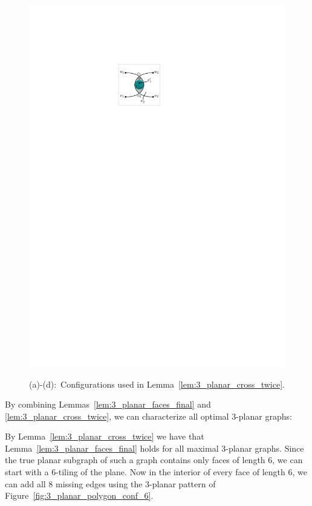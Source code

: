 \begin{figure}[htb]
\begin{minipage}[b]{.24\textwidth}
        \includegraphics[width=\textwidth,page=4]{images/3_planar_cross_twice}
        \subcaption{~}\label{fig:3_planar_cross_twice_main}
    \end{minipage}
    \caption{%
    (a)-(d):~Configurations used in Lemma~\ref{lem:3_planar_cross_twice}.
    \label{fig:3_planar_one_crossing_2}}
\end{figure}

By combining Lemmas~\ref{lem:3_planar_faces_final} and \ref{lem:3_planar_cross_twice}, we can characterize all optimal $3$-planar graphs:


 By Lemma~\ref{lem:3_planar_cross_twice} we have that Lemma~\ref{lem:3_planar_faces_final} holds for all maximal $3$-planar graphs. Since the true planar subgraph of such a graph contains only faces of length $6$, we can start with a $6$-tiling of the plane. Now in the interior of every face of length $6$, we can add all  $8$ missing edges using the $3$-planar pattern of Figure~\ref{fig:3_planar_polygon_conf_6}.

